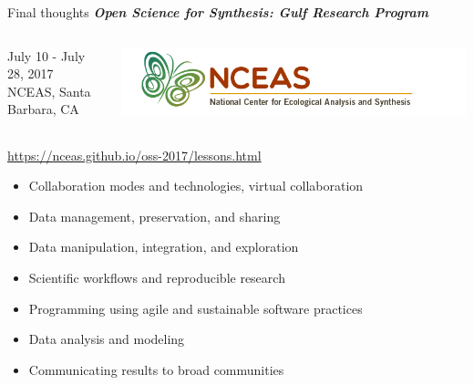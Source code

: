 \documentclass[serif]{beamer}\usepackage[]{graphicx}\usepackage[]{color}
\newcommand{\emtxt}[1]{\textbf{\textit{#1}}}
\begin{document}
\begin{frame}[t]{Final thoughts}{}
{\large \emtxt{Open Science for Synthesis: Gulf Research Program}}
\begin{columns}
\begin{column}{0.5\textwidth}
July 10 - July 28, 2017\\
NCEAS, Santa Barbara, CA 
\end{column}
\begin{column}{0.5\textwidth}
\hfill \includegraphics[width = \textwidth]{fig/nceas_full.png}
\end{column}
\end{columns}
\vspace{0.1in}
\vfill
\centerline{\url{https://nceas.github.io/oss-2017/lessons.html}}
\begin{itemize}
\item Collaboration modes and technologies, virtual collaboration
\item Data management, preservation, and sharing
\item Data manipulation, integration, and exploration
\item Scientific workflows and reproducible research
\item Programming using agile and sustainable software practices
\item Data analysis and modeling
\item Communicating results to broad communities
\end{itemize}
\vfill
\end{frame}
\end{document}

